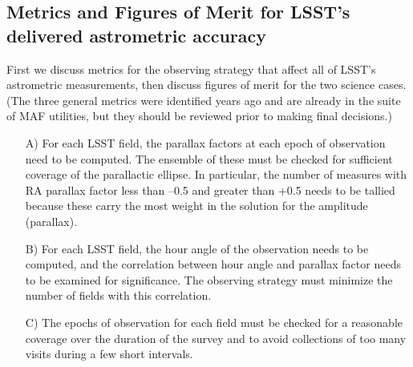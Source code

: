 


\subsection{Metrics and Figures of Merit for LSST's delivered astrometric accuracy}
\label{sec:keyword:MW_Astrometry_metrics}


First we discuss metrics for the observing strategy that affect all of
LSST's astrometric measurements, then discuss figures of merit for the
two science cases. (The three general metrics were identified years ago and
are already in the suite of MAF utilities, but they should be reviewed
prior to making final decisions.)

\begin{itemize}
\item[A)] For each LSST field, the parallax factors at each epoch of
observation need to be computed.  The ensemble of these must be checked for
sufficient coverage of the parallactic ellipse.  In particular, the number of
measures with RA parallax factor less than --0.5 and greater than +0.5
needs to be tallied because these carry the most weight in the solution
for the amplitude (parallax).
\item[B)] For each LSST field, the hour angle of the observation needs to be
computed, and the correlation between hour angle and parallax factor
needs to be examined for significance.  The observing strategy must minimize
the number of fields with this correlation.
\item[C)] The epochs of observation for each field must be checked for a
reasonable coverage over the duration of the survey and to avoid
collections of too many visits during a few short intervals.
\end{itemize}

